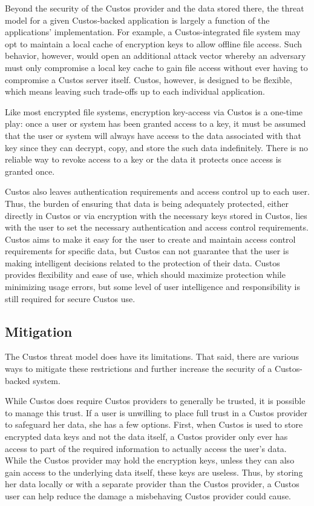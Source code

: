 Beyond the security of the Custos provider and the data stored there,
the threat model for a given Custos-backed application is largely a
function of the applications' implementation. For example, a
Custos-integrated file system may opt to maintain a local cache of
encryption keys to allow offline file access. Such behavior, however,
would open an additional attack vector whereby an adversary must only
compromise a local key cache to gain file access without ever having
to compromise a Custos server itself. Custos, however, is designed to
be flexible, which means leaving such trade-offs up to each individual
application.

Like most encrypted file systems, encryption key-access via Custos is
a one-time play: once a user or system has been granted access to a
key, it must be assumed that the user or system will always have
access to the data associated with that key since they can decrypt,
copy, and store the such data indefinitely. There is no reliable way
to revoke access to a key or the data it protects once access is
granted once.

Custos also leaves authentication requirements and access control up
to each user. Thus, the burden of ensuring that data is being
adequately protected, either directly in Custos or via encryption with
the necessary keys stored in Custos, lies with the user to set the
necessary authentication and access control requirements. Custos aims
to make it easy for the user to create and maintain access control
requirements for specific data, but Custos can not guarantee that the
user is making intelligent decisions related to the protection of
their data. Custos provides flexibility and ease of use, which should
maximize protection while minimizing usage errors, but some level of
user intelligence and responsibility is still required for secure
Custos use.

\subsection{Mitigation}

The Custos threat model does have its limitations. That said, there
are various ways to mitigate these restrictions and further increase
the security of a Custos-backed system.

While Custos does require Custos providers to generally be trusted, it
is possible to manage this trust. If a user is unwilling to place full
trust in a Custos provider to safeguard her data, she has a few
options. First, when Custos is used to store encrypted data keys and
not the data itself, a Custos provider only ever has access to part of
the required information to actually access the user's data. While the
Custos provider may hold the encryption keys, unless they can also
gain access to the underlying data itself, these keys are
useless. Thus, by storing her data locally or with a separate provider
than the Custos provider, a Custos user can help reduce the damage a
misbehaving Custos provider could cause.

